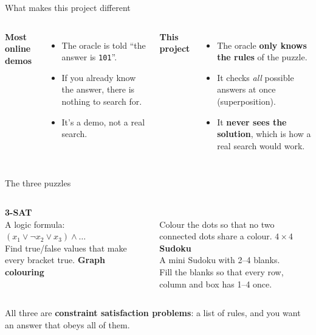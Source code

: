 \documentclass[aspectratio=169,11pt]{beamer}
\begin{document}
\begin{frame}{What makes this project different}
\begin{columns}[T]
\textbf{Most online demos}
\begin{itemize}
\item The oracle is told ``the answer is \texttt{101}''.
\item If you already know the answer, there is nothing to search for.
\item It's a demo, not a real search.
\end{itemize}
\textbf{This project}
\begin{itemize}
\item The oracle \textbf{only knows the rules} of the puzzle.
\item It checks \emph{all} possible answers at once (superposition).
\item It \textbf{never sees the solution}, which is how a real search would work.
\end{itemize}
\end{columns}
\end{frame}

\begin{frame}{The three puzzles}
\begin{columns}[T]
\textbf{3-SAT}\\[0.3em]
A logic formula:\\
{\small $(x_1 \lor \lnot x_2 \lor x_3)\land\dots$}\\[0.3em]
Find true/false values that make every bracket true.
\textbf{Graph colouring}\\[0.3em]
\\[0.3em]
Colour the dots so that no two connected dots share a colour.
\textbf{$4\times4$ Sudoku}\\[0.3em]
A mini Sudoku with 2--4 blanks.\\[0.3em]
Fill the blanks so that every row, column and box has 1--4 once.
\end{columns}
\vspace{1.2em}
All three are \textbf{constraint satisfaction problems}: a list of rules, and you want an answer that obeys all of them.
\end{frame}
\end{document}

